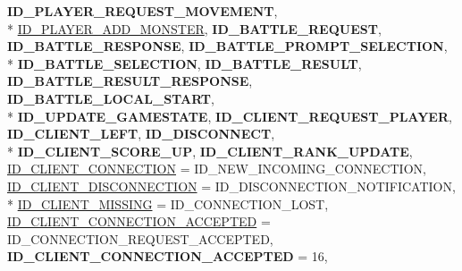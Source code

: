 \begin{DoxyCompactItemize}
{\bfseries I\-D\-\_\-\-P\-L\-A\-Y\-E\-R\-\_\-\-R\-E\-Q\-U\-E\-S\-T\-\_\-\-M\-O\-V\-E\-M\-E\-N\-T}, 
\\*
\hyperlink{namespace_champ_net_plugin_a2ade5cfa7cf6c25ab7236c6b54a57821ad42c079bb7459dbaf419eeb2e845f3e2}{I\-D\-\_\-\-P\-L\-A\-Y\-E\-R\-\_\-\-A\-D\-D\-\_\-\-M\-O\-N\-S\-T\-E\-R}, 
{\bfseries I\-D\-\_\-\-B\-A\-T\-T\-L\-E\-\_\-\-R\-E\-Q\-U\-E\-S\-T}, 
{\bfseries I\-D\-\_\-\-B\-A\-T\-T\-L\-E\-\_\-\-R\-E\-S\-P\-O\-N\-S\-E}, 
{\bfseries I\-D\-\_\-\-B\-A\-T\-T\-L\-E\-\_\-\-P\-R\-O\-M\-P\-T\-\_\-\-S\-E\-L\-E\-C\-T\-I\-O\-N}, 
\\*
{\bfseries I\-D\-\_\-\-B\-A\-T\-T\-L\-E\-\_\-\-S\-E\-L\-E\-C\-T\-I\-O\-N}, 
{\bfseries I\-D\-\_\-\-B\-A\-T\-T\-L\-E\-\_\-\-R\-E\-S\-U\-L\-T}, 
{\bfseries I\-D\-\_\-\-B\-A\-T\-T\-L\-E\-\_\-\-R\-E\-S\-U\-L\-T\-\_\-\-R\-E\-S\-P\-O\-N\-S\-E}, 
{\bfseries I\-D\-\_\-\-B\-A\-T\-T\-L\-E\-\_\-\-L\-O\-C\-A\-L\-\_\-\-S\-T\-A\-R\-T}, 
\\*
{\bfseries I\-D\-\_\-\-U\-P\-D\-A\-T\-E\-\_\-\-G\-A\-M\-E\-S\-T\-A\-T\-E}, 
{\bfseries I\-D\-\_\-\-C\-L\-I\-E\-N\-T\-\_\-\-R\-E\-Q\-U\-E\-S\-T\-\_\-\-P\-L\-A\-Y\-E\-R}, 
{\bfseries I\-D\-\_\-\-C\-L\-I\-E\-N\-T\-\_\-\-L\-E\-F\-T}, 
{\bfseries I\-D\-\_\-\-D\-I\-S\-C\-O\-N\-N\-E\-C\-T}, 
\\*
{\bfseries I\-D\-\_\-\-C\-L\-I\-E\-N\-T\-\_\-\-S\-C\-O\-R\-E\-\_\-\-U\-P}, 
{\bfseries I\-D\-\_\-\-C\-L\-I\-E\-N\-T\-\_\-\-R\-A\-N\-K\-\_\-\-U\-P\-D\-A\-T\-E}, 
\hyperlink{namespace_champ_net_plugin_a2ade5cfa7cf6c25ab7236c6b54a57821aecc0564c52e3106cfe012e5533b080da}{I\-D\-\_\-\-C\-L\-I\-E\-N\-T\-\_\-\-C\-O\-N\-N\-E\-C\-T\-I\-O\-N} = I\-D\-\_\-\-N\-E\-W\-\_\-\-I\-N\-C\-O\-M\-I\-N\-G\-\_\-\-C\-O\-N\-N\-E\-C\-T\-I\-O\-N, 
\hyperlink{namespace_champ_net_plugin_a2ade5cfa7cf6c25ab7236c6b54a57821a2ed0fbbbbe782bca6c76277c89050ad9}{I\-D\-\_\-\-C\-L\-I\-E\-N\-T\-\_\-\-D\-I\-S\-C\-O\-N\-N\-E\-C\-T\-I\-O\-N} = I\-D\-\_\-\-D\-I\-S\-C\-O\-N\-N\-E\-C\-T\-I\-O\-N\-\_\-\-N\-O\-T\-I\-F\-I\-C\-A\-T\-I\-O\-N, 
\\*
\hyperlink{namespace_champ_net_plugin_a2ade5cfa7cf6c25ab7236c6b54a57821a31932f93b241ffddf903d32af0fc2155}{I\-D\-\_\-\-C\-L\-I\-E\-N\-T\-\_\-\-M\-I\-S\-S\-I\-N\-G} = I\-D\-\_\-\-C\-O\-N\-N\-E\-C\-T\-I\-O\-N\-\_\-\-L\-O\-S\-T, 
\hyperlink{namespace_champ_net_plugin_a2ade5cfa7cf6c25ab7236c6b54a57821a0295101371b4a70a1c007a4f6e206e1d}{I\-D\-\_\-\-C\-L\-I\-E\-N\-T\-\_\-\-C\-O\-N\-N\-E\-C\-T\-I\-O\-N\-\_\-\-A\-C\-C\-E\-P\-T\-E\-D} = I\-D\-\_\-\-C\-O\-N\-N\-E\-C\-T\-I\-O\-N\-\_\-\-R\-E\-Q\-U\-E\-S\-T\-\_\-\-A\-C\-C\-E\-P\-T\-E\-D, 
{\bfseries I\-D\-\_\-\-C\-L\-I\-E\-N\-T\-\_\-\-C\-O\-N\-N\-E\-C\-T\-I\-O\-N\-\_\-\-A\-C\-C\-E\-P\-T\-E\-D} = 16, 

\end{DoxyCompactItemize}
